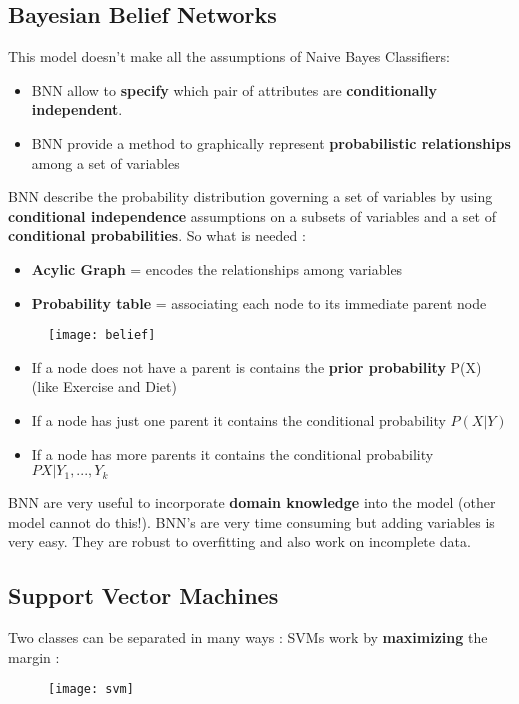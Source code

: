 \subsection{Bayesian Belief Networks}
This model doesn't make all the assumptions of Naive Bayes Classifiers:
\begin{itemize}
\item BNN allow to \textbf{specify} which pair of attributes are \textbf{conditionally independent}.
\item BNN provide a method to graphically represent \textbf{probabilistic relationships} among a set of variables
\end{itemize}
BNN describe the probability distribution governing a set of variables by using \textbf{conditional independence} assumptions on a subsets of variables and a set of \textbf{conditional probabilities}.
So what is needed :
\begin{itemize}
\item \textbf{Acylic Graph} = encodes the relationships among variables
\item \textbf{Probability table} = associating each node to its immediate parent node
\end{itemize}
\begin{figure}[H]
  \centering
  \texttt{[image: belief]}
\end{figure}
\begin{itemize}
\item If a node does not have a parent is contains the \textbf{prior probability} P(X) (like Exercise and Diet)
\item If a node has just one parent it contains the conditional probability $P(X|Y)$
\item If a node has more parents it contains the conditional probability $PX|Y_1,...,Y_k$ 
\end{itemize}
BNN are very useful to incorporate \textbf{domain knowledge} into the model (other model cannot do this!). BNN's are very time consuming but adding variables is very easy. They are robust to overfitting and also work on incomplete data.

\subsection{Support Vector Machines}
Two classes can be separated in many ways : SVMs work by \textbf{maximizing} the margin :
\begin{figure}[H]
  \centering
  \texttt{[image: svm]}
\end{figure}
